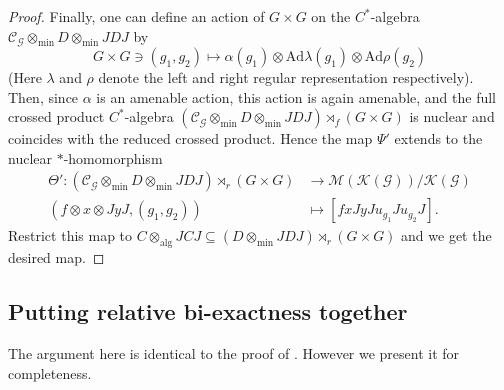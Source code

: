 \documentclass{amsart}
\theoremstyle{definition}
\renewcommand{\subset}{\subseteq}
\newcommand{\mintensor}{\otimes_{\mathrm{min}}}
\newcommand{\algtensor}{\otimes_{\mathrm{alg}}}
\begin{document}
\begin{proof}
Finally, one can define an action of $G\times G$ on the $C^{\ast}$-algebra $\mathcal{C}_{\mathcal{G}}\mintensor D\mintensor JDJ$ by
\[
G\times G\ni (g_1, g_2)\longmapsto 
\alpha(g_1)\otimes \mathrm{Ad}\lambda(g_1) 
\otimes \mathrm{Ad}\rho(g_2)
\]
(Here $\lambda$ and $\rho$ denote the left and right regular representation respectively). Then, since $\alpha$ is an amenable action, this action is again amenable, and the full crossed product $C^{\ast}$-algebra $(\mathcal{C}_{\mathcal{G}}\mintensor D\mintensor JDJ)\rtimes_f (G\times G)$ is nuclear and coincides with the reduced crossed product. Hence the map $\Psi'$ extends to the nuclear $\ast$-homomorphism
\begin{align}
\Theta' : (\mathcal{C}_{\mathcal{G}}\mintensor D\mintensor JDJ)\rtimes_r (G\times G) &\longrightarrow \mathcal{M}(\mathcal{K}(\mathcal{G}))/\mathcal{K}(\mathcal{G}) \\
(f\otimes x\otimes JyJ, (g_1, g_2)) &\longmapsto [fxJyJu_{g_1}Ju_{g_2}J]. 
\end{align}
Restrict this map to $C\algtensor JCJ \subset (D\mintensor JDJ)\rtimes_r (G\times G)$ and we get the desired map. 
\end{proof}


\subsection{Putting relative bi-exactness together}

The argument here is identical to the proof of \cite[Lemma 3.13]{hik}. However we present it for completeness. 
\end{document}

